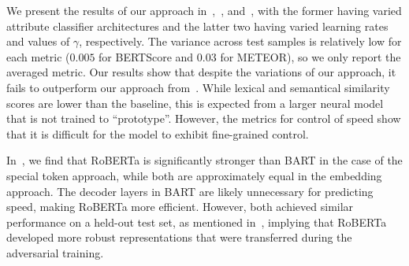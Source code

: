 We present the results of our approach in~,~, and~, with the former having varied attribute classifier architectures and the latter two having varied learning rates and values of $\gamma$, respectively. The variance across test samples is relatively low for each metric (\eg $0.005$ for BERTScore and $0.03$ for METEOR), so we only report the averaged metric. Our results show that despite the variations of our approach, it fails to outperform our approach from~. While lexical and semantical similarity scores are lower than the baseline, this is expected from a larger neural model that is not trained to ``prototype''. However, the metrics for control of speed show that it is difficult for the model to exhibit fine-grained control.

In~, we find that RoBERTa is significantly stronger than BART in the case of the special token approach, while both are approximately equal in the embedding approach. The decoder layers in BART are likely unnecessary for predicting speed, making RoBERTa more efficient. However, both achieved similar performance on a held-out test set, as mentioned in~, implying that RoBERTa developed more robust representations that were transferred during the adversarial training. 

